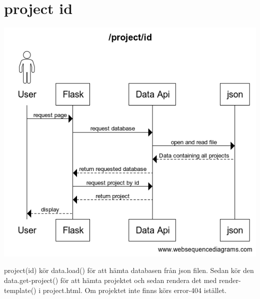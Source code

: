 \documentclass{TDP003mall}
\begin{document}
\section{project id}
\begin{center}
\includegraphics[scale=0.35]{project_id.png}
\end{center}
project(id) kör data.load() för att hämta databasen från json filen. Sedan kör den data.get-project() för att hämta projektet och sedan rendera det med render-template() i project.html. Om projektet inte finns körs error-404 istället.\\\\
\end{document}
